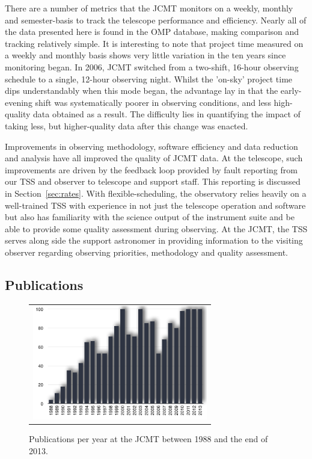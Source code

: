 \documentclass[]{spie}  %
\begin{document}
There are a number of metrics that the JCMT monitors on a weekly,
monthly and semester-basis to track the telescope performance and
efficiency. Nearly all of the data presented here is found in the OMP
database, making comparison and tracking relatively simple. It is
interesting to note that project time measured on a weekly and monthly
basis shows very little variation in the ten years since monitoring
began. In 2006, JCMT switched from a two-shift, 16-hour observing
schedule to a single, 12-hour observing night. Whilst the 'on-sky'
project time dips understandably when this mode began, the advantage
lay in that the early-evening shift was systematically poorer in
observing conditions, and less high-quality data obtained as a
result. The difficulty lies in quantifying the impact of taking less,
but higher-quality data after this change was enacted.

Improvements in observing methodology, software efficiency and data
reduction and analysis have all improved the quality of JCMT data. At
the telescope, such improvements are driven by the feedback loop
provided by fault reporting from our TSS and observer to telescope and
support staff. This reporting is discussed in
Section~\ref{sec:rates}. With flexible-scheduling, the observatory
relies heavily on a well-trained TSS with experience in not just the
telescope operation and software but also has familiarity with the
science output of the instrument suite and be able to provide some
quality assessment during observing. At the JCMT, the TSS serves along
side the support astronomer in providing information to the visiting
observer regarding observing priorities, methodology and quality
assessment.

\subsection{Publications}
 \begin{figure}[ht]
   \begin{center}
   \begin{tabular}{c}
   \includegraphics[height=5cm]{JCMT_publications.png}
   \end{tabular}
   \end{center}
   \caption{\label{fig:pub} Publications per year at the JCMT between 1988 and the end of 2013.}
\end{figure}
\end{document}
